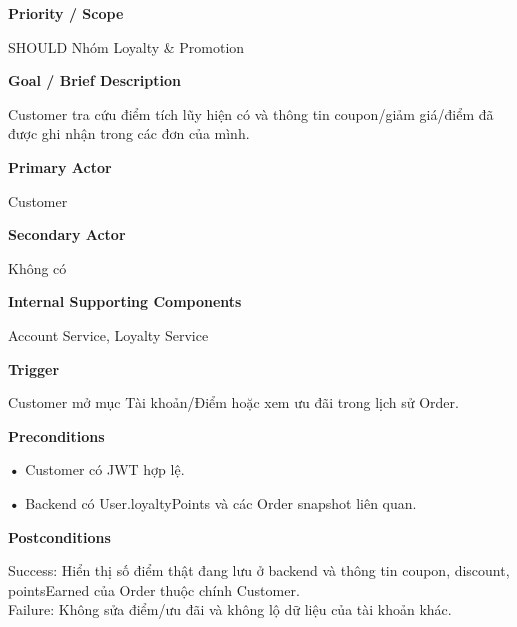 \documentclass[11pt,a4paper,oneside]{report}
\begin{document}
\par\smallskip\noindent\textcolor{sgublue}{\textbf{Priority / Scope}}\par\nobreak
SHOULD \textbar{} Nhóm Loyalty \& Promotion
\par

\par\smallskip\noindent\textcolor{sgublue}{\textbf{Goal / Brief Description}}\par\nobreak
Customer tra cứu điểm tích lũy hiện có và thông tin coupon/giảm giá/điểm đã được ghi nhận trong các đơn của mình.
\par

\par\smallskip\noindent\textcolor{sgublue}{\textbf{Primary Actor}}\par\nobreak
Customer
\par

\par\smallskip\noindent\textcolor{sgublue}{\textbf{Secondary Actor}}\par\nobreak
Không có
\par

\par\smallskip\noindent\textcolor{sgublue}{\textbf{Internal Supporting Components}}\par\nobreak
Account Service, Loyalty Service
\par

\par\smallskip\noindent\textcolor{sgublue}{\textbf{Trigger}}\par\nobreak
Customer mở mục Tài khoản/Điểm hoặc xem ưu đãi trong lịch sử Order.
\par

\par\smallskip\noindent\textcolor{sgublue}{\textbf{Preconditions}}\par\nobreak
\textbf{•} Customer có JWT hợp lệ.

\textbf{•} Backend có User.loyaltyPoints và các Order snapshot liên quan.
\par

\par\smallskip\noindent\textcolor{sgublue}{\textbf{Postconditions}}\par\nobreak
Success: Hiển thị số điểm thật đang lưu ở backend và thông tin coupon, discount, pointsEarned của Order thuộc chính Customer.\\
Failure: Không sửa điểm/ưu đãi và không lộ dữ liệu của tài khoản khác.\strut
\par
\end{document}
